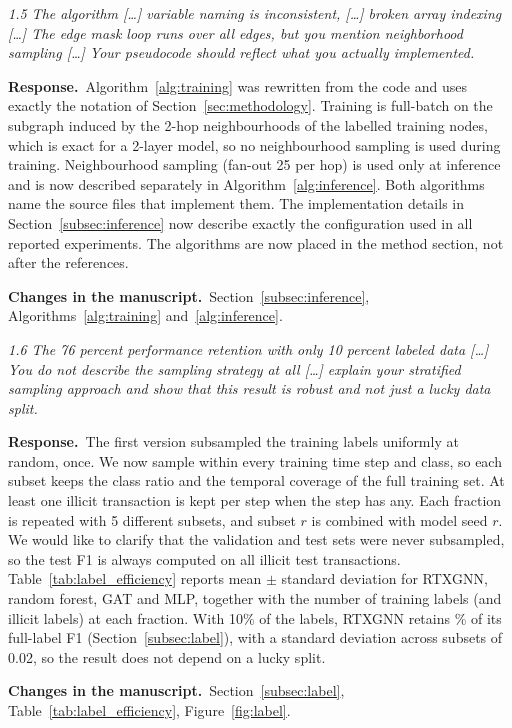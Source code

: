 \documentclass[11pt]{article}
\newenvironment{comment}{\par\medskip\noindent\begin{minipage}{\linewidth}\itshape\color{black!75}}{\end{minipage}\par\smallskip}
\newcommand{\resp}{\par\noindent\textbf{Response.}\ }
\newcommand{\change}{\par\noindent\textbf{Changes in the manuscript.}\ }
\begin{document}
\begin{comment}
1.5 The algorithm [\dots] variable naming is inconsistent, [\dots] broken array indexing [\dots] The edge mask loop runs over all edges, but you mention neighborhood sampling [\dots] Your pseudocode should reflect what you actually implemented.
\end{comment}
\resp Algorithm~\ref{alg:training} was rewritten from the code and uses exactly the notation of Section~\ref{sec:methodology}. Training is full-batch on the subgraph induced by the 2-hop neighbourhoods of the labelled training nodes, which is exact for a 2-layer model, so no neighbourhood sampling is used during training. Neighbourhood sampling (fan-out 25 per hop) is used only at inference and is now described separately in Algorithm~\ref{alg:inference}. Both algorithms name the source files that implement them. The implementation details in Section~\ref{subsec:inference} now describe exactly the configuration used in all reported experiments. The algorithms are now placed in the method section, not after the references.
\change Section~\ref{subsec:inference}, Algorithms~\ref{alg:training} and~\ref{alg:inference}.

\begin{comment}
1.6 The 76 percent performance retention with only 10 percent labeled data [\dots] You do not describe the sampling strategy at all [\dots] explain your stratified sampling approach and show that this result is robust and not just a lucky data split.
\end{comment}
\resp The first version subsampled the training labels uniformly at random, once. We now sample within every training time step and class, so each subset keeps the class ratio and the temporal coverage of the full training set. At least one illicit transaction is kept per step when the step has any. Each fraction is repeated with 5 different subsets, and subset $r$ is combined with model seed $r$. We would like to clarify that the validation and test sets were never subsampled, so the test F1 is always computed on all \nTestIllicit{} illicit test transactions. Table~\ref{tab:label_efficiency} reports mean $\pm$ standard deviation for RTXGNN, random forest, GAT and MLP, together with the number of training labels (and illicit labels) at each fraction. With 10\% of the labels, RTXGNN retains \lertxgnnOneZeroPct\% of its full-label F1 (Section~\ref{subsec:label}), with a standard deviation across subsets of 0.02, so the result does not depend on a lucky split.
\change Section~\ref{subsec:label}, Table~\ref{tab:label_efficiency}, Figure~\ref{fig:label}.
\end{document}
